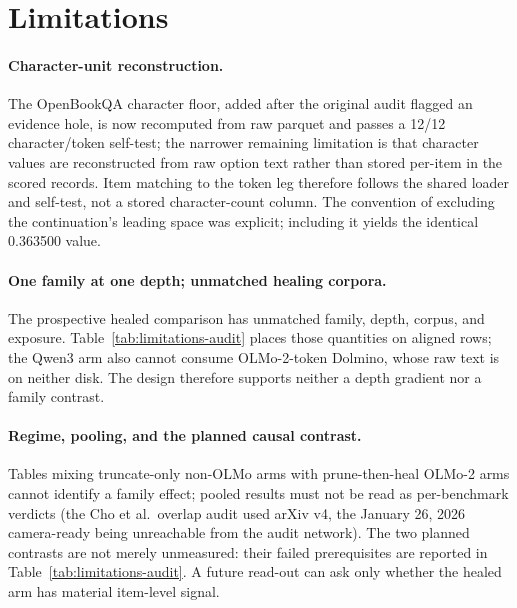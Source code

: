 
\section{Limitations}
\label{sec:limitations}

\paragraph{Character-unit reconstruction.}
The OpenBookQA character floor, added after the original audit flagged an evidence hole, is now recomputed from raw parquet and passes a 12/12 character/token self-test; the narrower remaining limitation is that character values are reconstructed from raw option text rather than stored per-item in the scored records. Item matching to the token leg therefore follows the shared loader and self-test, not a stored character-count column. The convention of excluding the continuation's leading space was explicit; including it yields the identical 0.363500 value.

\paragraph{One family at one depth; unmatched healing corpora.}
The prospective healed comparison has unmatched family, depth, corpus, and exposure. Table~\ref{tab:limitations-audit} places those quantities on aligned rows; the Qwen3 arm also cannot consume OLMo-2-token Dolmino, whose raw text is on neither disk. The design therefore supports neither a depth gradient nor a family contrast.

\paragraph{Regime, pooling, and the planned causal contrast.}
Tables mixing truncate-only non-OLMo arms with prune-then-heal OLMo-2 arms cannot identify a family effect; pooled results must not be read as per-benchmark verdicts (the Cho et al.\ overlap audit used arXiv v4, the January 26, 2026 camera-ready being unreachable from the audit network). The two planned contrasts are not merely unmeasured: their failed prerequisites are reported in Table~\ref{tab:limitations-audit}. A future read-out can ask only whether the healed arm has material item-level signal.


